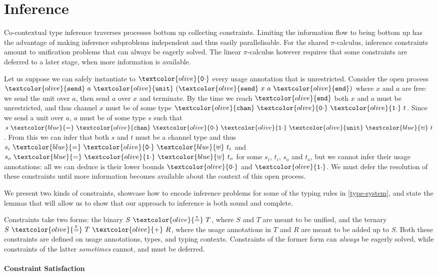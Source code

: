 \documentclass[sigplan,screen,review]{acmart}
\newcommand{\picalc}{$\pi$-calculus}
\newcommand{\constr}[1]{\textcolor{olive}{\mathtt{#1}}}
\newcommand{\type}[1]{\textcolor{blue}{\mathtt{#1}}}
\newcommand{\tSplit}[3]{#1~\type{=}~#2~\type{\uplus}~#3}
\newcommand{\sunit}{\constr{unit}}
\newcommand{\send}{\constr{end}}
\newcommand{\ssend}{\constr{send}}
\newcommand{\tchan}{\constr{chan}}
\newcommand{\tunit}{\constr{unit}}
\newcommand{\tzero}{\constr{0\cdot}}
\newcommand{\tone}{\constr{1\cdot}}
\newcommand{\eqconstr}[2]{#1 ~ \constr{\stackrel{c}{=}} ~ #2}
\newcommand{\sumconstr}[3]{#1 ~ \constr{\stackrel{c}{=}} ~ #2 ~ \constr{+} ~ #3}
\begin{document}
     
\section{Inference}\label{inference}

Co-contextual type inference traverses processes bottom up collecting constraints.
Limiting the information flow to being bottom up has the advantage of making inference subproblems independent and thus easily parallelisable.
For the shared \picalc{}, inference constraints amount to unification problems that can always be eagerly solved.
The linear \picalc{} however requires that some constraints are deferred to a later stage, when more information is available.

Let us suppose we can safely instantiate to $\tzero$ every usage annotation that is unrestricted.
Consider the open process $\ssend~a~\sunit~(\ssend~x~a~\send)$ where $x$ and $a$ are free: we send the unit over $a$, then send $a$ over $x$ and terminate.
By the time we reach $\send$ both $x$ and $a$ must be unrestricted, and thus channel $x$ must be of some type $\tchan~\tzero~\tone~t$.
Since we send a unit over $a$, $a$ must be of some type $s$ such that $\tSplit{s}{\tchan~\tzero~\tone~\tunit}{t}$.
From this we can infer that both $s$ and $t$ must be a channel type and thus $\tSplit{s_i}{\tzero}{t_i}$ and $\tSplit{s_o}{\tone}{t_o}$ for some $s_i$, $t_i$, $s_o$ and $t_o$, but we cannot infer their usage annotations: all we can deduce is their lower bounds $\tzero$ and $\tone$.
We must defer the resolution of these constraints until more information becomes available about the context of this open process.

We present two kinds of constraints, showcase how to encode inference problems for some of the typing rules in \autoref{type-system}, and state the lemmas that will allow us to show that our approach to inference is both sound and complete.

Constraints take two forms: the binary $\eqconstr{S}{T}$, where $S$ and $T$ are meant to be unified, and the ternary $\sumconstr{S}{T}{R}$, where the usage annotations in $T$ and $R$ are meant to be added up to $S$.
Both these constraints are defined on usage annotations, types, and typing contexts.
Constraints of the former form can \emph{always} be eagerly solved, while constraints of the latter \emph{sometimes} cannot, and must be deferred.

\paragraph{Constraint Satisfaction}
\end{document}
